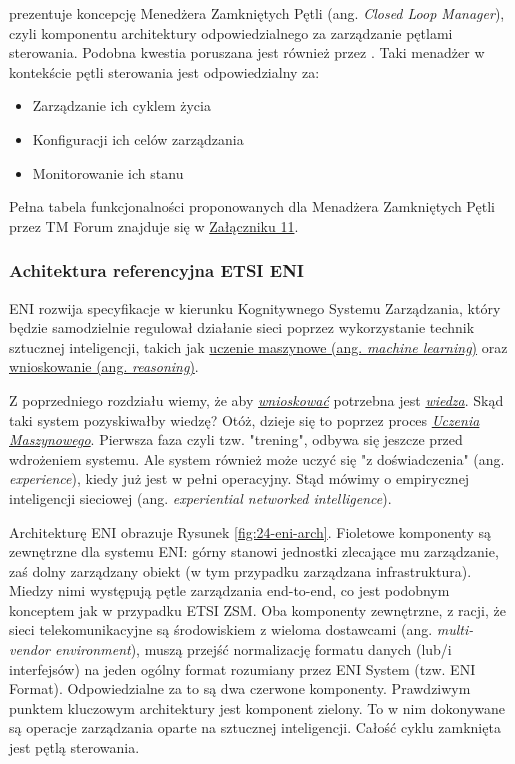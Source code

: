 \cite{tmforum2022ai} prezentuje koncepcję Menedżera Zamkniętych Pętli (ang. \textit{Closed Loop Manager}), czyli komponentu architektury odpowiedzialnego za zarządzanie pętlami sterowania. Podobna kwestia poruszana jest również przez \cite{ngmn2022}. Taki menadżer w kontekście pętli sterowania jest odpowiedzialny za:
\begin{itemize}
    \item Zarządzanie ich cyklem życia 
    \item Konfiguracji ich celów zarządzania
    \item Monitorowanie ich stanu
\end{itemize}

Pełna tabela funkcjonalności proponowanych dla Menadżera Zamkniętych Pętli przez TM Forum znajduje się w \hyperlink{appendix:11}{Załączniku 11}.

\subsubsection{Achitektura referencyjna ETSI ENI}

ENI rozwija specyfikacje w kierunku Kognitywnego Systemu Zarządzania, który będzie samodzielnie regulował działanie sieci poprzez wykorzystanie technik sztucznej inteligencji, takich jak \hyperlink{def:uczenie-maszynowe}{uczenie maszynowe (ang. \textit{machine learning})} oraz \hyperlink{def:wnioskowanie}{wnioskowanie (ang. \textit{reasoning})}. 

Z poprzedniego rozdziału wiemy, że aby \hyperlink{def:wnioskowanie}{\textit{wnioskować}} potrzebna jest \hyperlink{def:wiedza}{\textit{wiedza}}. Skąd taki system pozyskiwałby wiedzę? Otóż, dzieje się to poprzez proces \hyperlink{def:uczenie-maszynowe}{\textit{Uczenia Maszynowego}}. Pierwsza faza czyli tzw. "trening", odbywa się jeszcze przed wdrożeniem systemu. Ale system również może uczyć się "z doświadczenia" (ang. \textit{experience}), kiedy już jest w pełni operacyjny. Stąd mówimy o empirycznej inteligencji sieciowej (ang. \textit{experiential networked intelligence}). 

Architekturę \cite{etsieni2023} ENI obrazuje Rysunek \ref{fig:24-eni-arch}. Fioletowe komponenty są zewnętrzne dla systemu ENI: górny stanowi jednostki zlecające mu zarządzanie, zaś dolny zarządzany obiekt (w tym przypadku zarządzana infrastruktura). Miedzy nimi występują pętle zarządzania end-to-end, co jest podobnym konceptem jak w przypadku ETSI ZSM. Oba komponenty zewnętrzne, z racji, że sieci telekomunikacyjne są środowiskiem z wieloma dostawcami (ang. \textit{multi-vendor environment}), muszą przejść normalizację formatu danych (lub/i interfejsów) na jeden ogólny format rozumiany przez ENI System (tzw. ENI Format). Odpowiedzialne za to są dwa czerwone komponenty. Prawdziwym punktem kluczowym architektury jest komponent zielony. To w nim dokonywane są operacje zarządzania oparte na sztucznej inteligencji. Całość cyklu zamknięta jest pętlą sterowania. 

